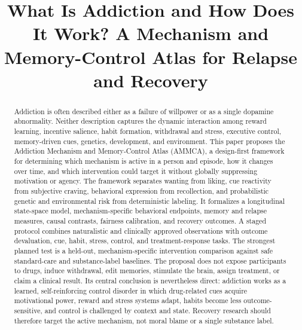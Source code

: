 \documentclass[conference]{IEEEtran}
\begin{document}
\title{What Is Addiction and How Does It Work? A Mechanism and Memory-Control Atlas for Relapse and Recovery}

\author{
}

\maketitle

\begin{abstract}
Addiction is often described either as a failure of willpower or as a single dopamine abnormality. Neither description captures the dynamic interaction among reward learning, incentive salience, habit formation, withdrawal and stress, executive control, memory-driven cues, genetics, development, and environment. This paper proposes the Addiction Mechanism and Memory-Control Atlas (AMMCA), a design-first framework for determining which mechanism is active in a person and episode, how it changes over time, and which intervention could target it without globally suppressing motivation or agency. The framework separates wanting from liking, cue reactivity from subjective craving, behavioral expression from recollection, and probabilistic genetic and environmental risk from deterministic labeling. It formalizes a longitudinal state-space model, mechanism-specific behavioral endpoints, memory and relapse measures, causal contrasts, fairness calibration, and recovery outcomes. A staged protocol combines naturalistic and clinically approved observations with outcome devaluation, cue, habit, stress, control, and treatment-response tasks. The strongest planned test is a held-out, mechanism-specific intervention comparison against safe standard-care and substance-label baselines. The proposal does not expose participants to drugs, induce withdrawal, edit memories, stimulate the brain, assign treatment, or claim a clinical result. Its central conclusion is nevertheless direct: addiction works as a learned, self-reinforcing control disorder in which drug-related cues acquire motivational power, reward and stress systems adapt, habits become less outcome-sensitive, and control is challenged by context and state. Recovery research should therefore target the active mechanism, not moral blame or a single substance label.
\end{abstract}
\end{document}
